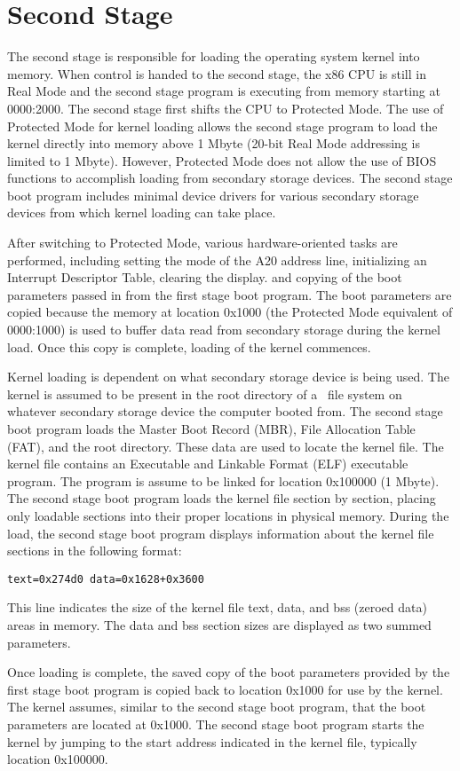 \section{Second Stage}

The second stage is responsible for loading the operating system
kernel into memory.  When control is handed to the second stage,
the x86 CPU is still in Real Mode and the second stage program is
executing from memory starting at 0000:2000.  The second stage
first shifts the CPU to Protected Mode.  The use of Protected Mode
for kernel loading allows the second stage program to load the
kernel directly into memory above 1 Mbyte (20-bit Real Mode
addressing is limited to 1 Mbyte).  However, Protected Mode does
not allow the use of BIOS functions to accomplish loading from
secondary storage devices.  The second stage boot program includes
minimal device drivers for various secondary storage devices from
which kernel loading can take place.

After switching to Protected Mode, various hardware-oriented tasks
are performed, including setting the mode of the A20 address line,
initializing an Interrupt Descriptor Table, clearing the display.
and copying of the boot parameters passed in from the first
stage boot program.  The boot parameters are copied because the
memory at location 0x1000 (the Protected Mode equivalent of
0000:1000) is used to buffer data read from secondary storage
during the kernel load.  Once this copy is complete, loading
of the kernel commences.

Kernel loading is dependent on what secondary storage device is
being used.  The kernel is assumed to be present in the root
directory of a \roadrunner\  file system on whatever secondary
storage device the computer booted from.  The second stage boot
program loads the Master Boot Record (MBR), File Allocation
Table (FAT), and the root directory.  These data are used to
locate the kernel file.  The kernel file contains an Executable
and Linkable Format (ELF) executable program.  The program is
assume to be linked for location 0x100000 (1 Mbyte).  The second
stage boot program loads the kernel file section by section,
placing only loadable sections into their proper locations in
physical memory.  During the load, the second stage boot program
displays information about the kernel file sections in the
following format:

\begin{verbatim}
text=0x274d0 data=0x1628+0x3600
\end{verbatim}

\noindent This line indicates the size of the kernel file text,
data, and bss (zeroed data) areas in memory.  The data and bss
section sizes are displayed as two summed parameters.

Once loading is complete, the saved copy of the boot parameters
provided by the first stage boot program is copied back to location
0x1000 for use by the kernel.  The kernel assumes, similar to the
second stage boot program, that the boot parameters are located
at 0x1000.  The second stage boot program starts the kernel by
jumping to the start address indicated in the kernel file,
typically location 0x100000.
